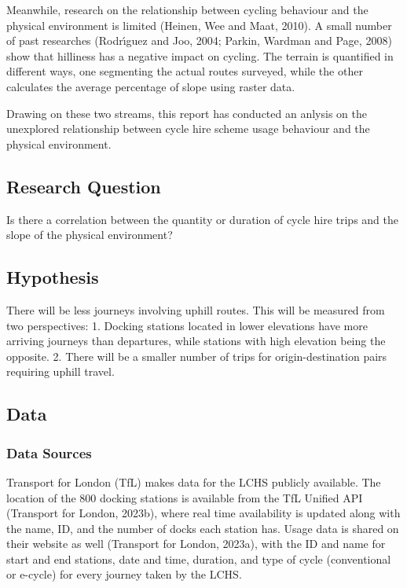 \documentclass[
  a4paper,
  DIV=11,
  numbers=noendperiod]{scrartcl}
\begin{document}
Meanwhile, research on the relationship between cycling behaviour and
the physical environment is limited (Heinen, Wee and Maat, 2010). A
small number of past researches (Rodrı́guez and Joo, 2004; Parkin,
Wardman and Page, 2008) show that hilliness has a negative impact on
cycling. The terrain is quantified in different ways, one segmenting the
actual routes surveyed, while the other calculates the average
percentage of slope using raster data.

Drawing on these two streams, this report has conducted an anlysis on
the unexplored relationship between cycle hire scheme usage behaviour
and the physical environment.

\hypertarget{research-question}{%
\subsection{Research Question}\label{research-question}}

Is there a correlation between the quantity or duration of cycle hire
trips and the slope of the physical environment?

\hypertarget{hypothesis}{%
\subsection{Hypothesis}\label{hypothesis}}

There will be less journeys involving uphill routes. This will be
measured from two perspectives: 1. Docking stations located in lower
elevations have more arriving journeys than departures, while stations
with high elevation being the opposite. 2. There will be a smaller
number of trips for origin-destination pairs requiring uphill travel.

\hypertarget{data}{%
\subsection{Data}\label{data}}

\hypertarget{data-sources}{%
\subsubsection{Data Sources}\label{data-sources}}

Transport for London (TfL) makes data for the LCHS publicly available.
The location of the 800 docking stations is available from the TfL
Unified API (Transport for London, 2023b), where real time availability
is updated along with the name, ID, and the number of docks each station
has. Usage data is shared on their website as well (Transport for
London, 2023a), with the ID and name for start and end stations, date
and time, duration, and type of cycle (conventional or e-cycle) for
every journey taken by the LCHS.
\end{document}
